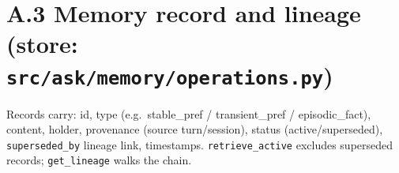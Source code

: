 \section{\texorpdfstring{A.3 Memory record and lineage (store:
\texttt{src/ask/memory/operations.py})}{A.3 Memory record and lineage (store: src/ask/memory/operations.py)}}\label{a.3-memory-record-and-lineage-store-srcaskmemoryoperations.py}

Records carry: id, type (e.g.~stable\_pref / transient\_pref /
episodic\_fact), content, holder, provenance (source turn/session),
status (active/superseded), \texttt{superseded\_by} lineage link,
timestamps. \texttt{retrieve\_active} excludes superseded records;
\texttt{get\_lineage} walks the chain.
